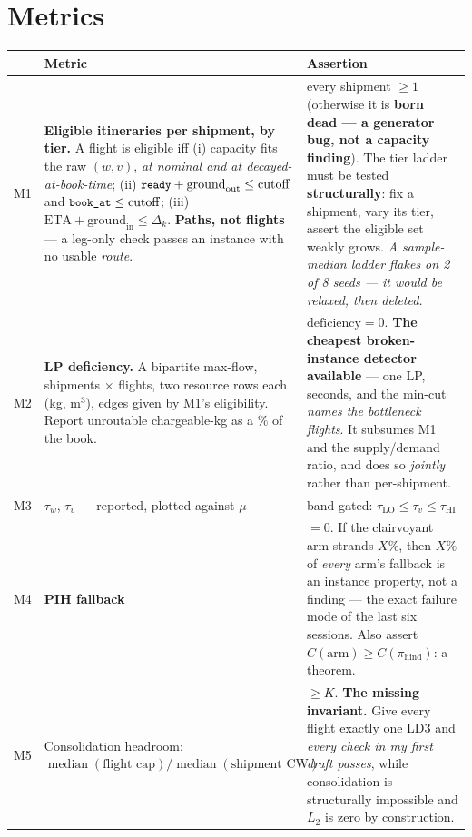 \documentclass[11pt,a4paper]{article}
\newcommand{\src}[1]{\texttt{\small #1}}
\begin{document}
\section{Metrics}

\begin{center}
\begin{tabularx}{\textwidth}{@{}lLL@{}}
\toprule
& \textbf{Metric} & \textbf{Assertion} \\
\midrule
M1 & \textbf{Eligible itineraries per shipment, by tier.} A flight is eligible iff
(i) capacity fits the raw $(w,v)$, \emph{at nominal and at decayed-at-book-time};
(ii) $\src{ready} + \text{ground}_{\text{out}} \le \text{cutoff}$ and $\src{book\_at} \le \text{cutoff}$;
(iii) $\text{ETA} + \text{ground}_{\text{in}} \le \Delta_k$.
\textbf{Paths, not flights} --- a leg-only check passes an instance with no usable \emph{route}.
& every shipment $\ge 1$ (otherwise it is \textbf{born dead --- a generator bug, not a capacity finding}).
The tier ladder must be tested \textbf{structurally}: fix a shipment, vary its tier, assert the eligible set
weakly grows. \emph{A sample-median ladder flakes on 2 of 8 seeds --- it would be relaxed, then deleted.} \\[3pt]
M2 & \textbf{LP deficiency.} A bipartite max-flow, shipments $\times$ flights, two resource rows each
(kg, m$^3$), edges given by M1's eligibility. Report unroutable chargeable-kg as a \% of the book.
& $\text{deficiency} = 0$. \textbf{The cheapest broken-instance detector available} --- one LP, seconds, and
the min-cut \emph{names the bottleneck flights}. It subsumes M1 and the supply/demand ratio, and does so
\emph{jointly} rather than per-shipment. \\[3pt]
M3 & $\tau_w$, $\tau_v$ --- reported, plotted against $\mu$ & band-gated:
$\tau_{\text{LO}} \le \tau_v \le \tau_{\text{HI}}$ \\[3pt]
M4 & \textbf{PIH fallback} & $= 0$. If the clairvoyant arm strands $X\%$, then $X\%$ of \emph{every} arm's
fallback is an instance property, not a finding --- the exact failure mode of the last six sessions. Also
assert $C(\text{arm}) \ge C(\pi_{\text{hind}})$: a theorem. \\[3pt]
M5 & Consolidation headroom:
$\operatorname{median}(\text{flight cap}) / \operatorname{median}(\text{shipment CW})$
& $\ge K$. \textbf{The missing invariant.} Give every flight exactly one LD3 and \emph{every check in my
first draft passes}, while consolidation is structurally impossible and $L_2$ is zero by construction. \\
\bottomrule
\end{tabularx}
\end{center}
\end{document}
